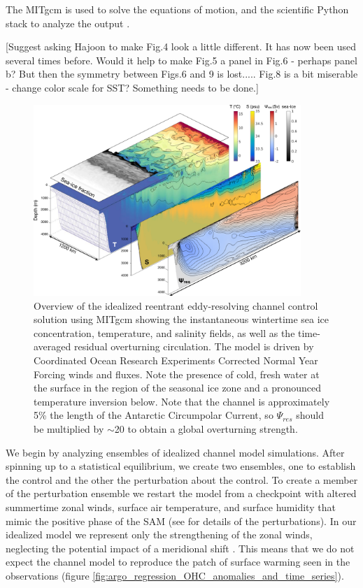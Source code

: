 \documentclass{ametsocV5}
\begin{document}
The MITgcm \citep{Marshall1997,Marshall1997b} is used to solve the equations of motion, and the scientific Python stack to analyze the output \citep{Hoyer2017,Hunter2007,Kluyver2016,Perez2007,VanDerWalt2011}.

[Suggest asking Hajoon to make Fig.4 look a little different. It has now been used several times before. Would it help to make Fig.5 a panel in Fig.6 - perhaps panel b? But then the symmetry between Figs.6 and 9 is lost.....
Fig.8 is a bit miserable - change color scale for SST? Something needs to be done.]
\begin{figure}[!ht]
    \begin{center}
        \includegraphics[width=0.9\textwidth]{figures/channel_3d_nobox.png}
        \caption{Overview of the idealized reentrant eddy-resolving channel control solution using MITgcm \citep{Marshall1997,Marshall1997b} showing the instantaneous wintertime sea ice concentration, temperature, and salinity fields, as well as the time-averaged residual overturning circulation. The model is driven by Coordinated Ocean Research Experiments Corrected Normal Year Forcing winds and fluxes. Note the presence of cold, fresh water at the surface in the region of the seasonal ice zone and a pronounced temperature inversion below. Note that the channel is approximately 5\% the length of the Antarctic Circumpolar Current, so $\Psi_{res}$ should be multiplied by $\sim$20 to obtain a global overturning strength.}
        \label{fig:channel_overview}
    \end{center}
\end{figure}


We begin by analyzing ensembles of idealized channel model simulations. After spinning up to a statistical equilibrium, we create two ensembles, one to establish the control and the other the perturbation about the control. To create a member of the perturbation ensemble we restart the model from a checkpoint with altered summertime zonal winds, surface air temperature, and surface humidity that mimic the positive phase of the SAM (see \citet{Doddridge2019a} for details of the perturbations). In our idealized model we represent only the strengthening of the zonal winds, neglecting the potential impact of a meridional shift \citep[c.f.][]{Waugh2019}. This means that we do not expect the channel model to reproduce the patch of surface warming seen in the observations (figure \ref{fig:argo_regression_OHC_anomalies_and_time_series}).
\end{document}
